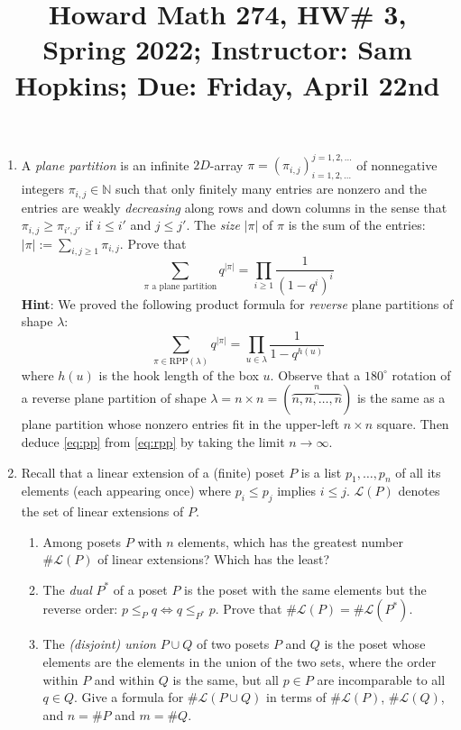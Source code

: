 \documentclass[11pt]{article}
\title{Howard Math 274, HW\# 3, \\ {\normalsize Spring 2022; Instructor: Sam Hopkins; Due: Friday, April 22nd}}
\date{}
\begin{document}
\maketitle

\thispagestyle{empty}

\vspace{-2cm}

\begin{enumerate}

\item A \emph{plane partition} is an infinite $2D$-array $\pi = (\pi_{i,j})_{i=1,2,\ldots}^{j=1,2,\ldots}$ of nonnegative integers $\pi_{i,j} \in \mathbb{N}$ such that only finitely many entries are nonzero and the entries are weakly \emph{decreasing} along rows and down columns in the sense that $\pi_{i,j} \geq \pi_{i',j'}$ if $i \leq i'$ and $j \leq j'$. The \emph{size} $|\pi|$ of $\pi$ is the sum of the entries: $|\pi| :=\sum_{i,j \geq 1} \pi_{i,j}$. Prove that 
\begin{equation} \label{eq:pp} \sum_{\textrm{$\pi$ a plane partition}} q^{|\pi|} = \prod_{i \geq 1} \frac{1}{(1-q^i)^i} \end{equation}
{\bf Hint}: We proved the following product formula for \emph{reverse} plane partitions of shape $\lambda$:
\begin{equation} \label{eq:rpp} \sum_{\pi \in \mathrm{RPP}(\lambda)} q^{|\pi|} = \prod_{u \in \lambda} \frac{1}{1-q^{h(u)}} \end{equation}
where $h(u)$ is the hook length of the box $u$. Observe that a $180^\circ$ rotation of a reverse plane partition of shape $\lambda = n \times n = (\overbrace{n,n,\ldots,n}^{n})$ is the same as a plane partition whose nonzero entries fit in the upper-left $n\times n$ square. Then deduce \eqref{eq:pp} from \eqref{eq:rpp} by taking the limit $n\to \infty$.

\item Recall that a linear extension of a (finite) poset $P$ is a list $p_1,\ldots,p_n$ of all its elements (each appearing once) where $p_i \leq p_j$ implies $i \leq j$. $\mathcal{L}(P)$ denotes the set of linear extensions of $P$.
\begin{enumerate}
\item Among posets $P$ with $n$ elements, which has the greatest number $\#\mathcal{L}(P)$ of linear extensions? Which has the least?
\item The \emph{dual} $P^{*}$ of a poset $P$ is the poset with the same elements but the reverse order: $p \leq_{P} q \Leftrightarrow q \leq_{P^*} p$. Prove that $\#\mathcal{L}(P)=\#\mathcal{L}(P^*)$.
\item The \emph{(disjoint) union} $P \cup Q$ of two posets $P$ and $Q$ is the poset whose elements are the elements in the union of the two sets, where the order within $P$ and within $Q$ is the same, but all $p \in P$ are incomparable to all $q\in Q$. Give a formula for $\#\mathcal{L}(P\cup Q)$ in terms of $\#\mathcal{L}(P)$, $\#\mathcal{L}(Q)$, and $n = \#P$ and $m = \#Q$.
\end{enumerate}


\end{enumerate}
\end{document}
